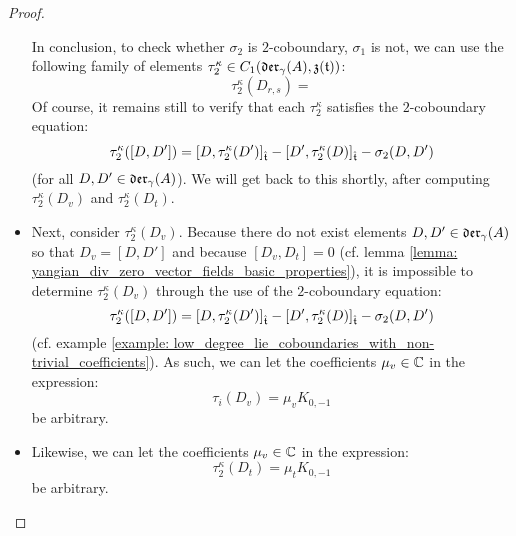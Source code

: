 \begin{proof}
\begin{itemize}
                    In conclusion, to check whether $\sigma_2$ is $2$-coboundary, $\sigma_1$ is not, we can use the following family of elements $\tau_2^{\kappa} \in C_1(\mathfrak{der}_{\gamma}(A), \mathfrak{z}(\mathfrak{t}))$:
                        $$\tau_2^{\kappa}(D_{r, s}) = $$
                    Of course, it remains still to verify that each $\tau_2^{\kappa}$ satisfies the $2$-coboundary equation:
                        $$\tau_2^{\kappa}([D, D']) = [D, \tau_2^{\kappa}(D')]_{\hat{\mathfrak{t}}} - [D', \tau_2^{\kappa}(D)]_{\hat{\mathfrak{t}}} - \sigma_2(D, D')$$
                    (for all $D, D' \in \mathfrak{der}_{\gamma}(A)$). We will get back to this shortly, after computing $\tau_2^{\kappa}(D_v)$ and $\tau_2^{\kappa}(D_t)$.
                    \item Next, consider $\tau_2^{\kappa}(D_v)$. Because there do not exist elements $D, D' \in \mathfrak{der}_{\gamma}(A)$ so that $D_v = [D, D']$ and because $[D_v, D_t] = 0$ (cf. lemma \ref{lemma: yangian_div_zero_vector_fields_basic_properties}), it is impossible to determine $\tau_2^{\kappa}(D_v)$ through the use of the $2$-coboundary equation:
                        $$\tau_2^{\kappa}([D, D']) = [D, \tau_2^{\kappa}(D')]_{\hat{\mathfrak{t}}} - [D', \tau_2^{\kappa}(D)]_{\hat{\mathfrak{t}}} - \sigma_2(D, D')$$
                    (cf. example \ref{example: low_degree_lie_coboundaries_with_non-trivial_coefficients}). As such, we can let the coefficients $\mu_v \in \mathbb{C}$ in the expression:
                        $$\tau_i(D_v) = \mu_v K_{0, -1}$$
                    be arbitrary.
                    \item Likewise, we can let the coefficients $\mu_v \in \mathbb{C}$ in the expression:
                        $$\tau_2^{\kappa}(D_t) = \mu_t K_{0, -1}$$
                    be arbitrary.
                \end{itemize}


\end{proof}
